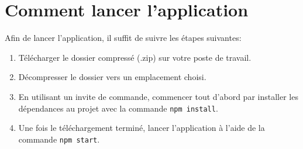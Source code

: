 \documentclass[12pt]{/home/samuel/Documents/GLO/latex/documentClass/GLO_ULAVAL}
\begin{document}
\modifyItemize{}
\maketitle

\chapter*{Comment lancer l'application}
Afin de lancer l'application, il suffit de suivre les étapes suivantes:
\begin{enumerate}
  \item Télécharger le dossier compressé (.zip) sur votre poste de travail.
  \item Décompresser le dossier vers un emplacement choisi.
  \item En utilisant un invite de commande, commencer tout d'abord par installer les dépendances au projet avec la commande \texttt{npm install}.
  \item Une fois le téléchargement terminé, lancer l'application à l'aide de la commande \texttt{npm start}.
\end{enumerate}
\end{document}
